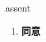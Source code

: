 
\begin{frame}
{\huge assent}
\begin{center}
\begin{enumerate}\Large
  \item \textbf{同意}
\end{enumerate}
\end{center}
\end{frame}
